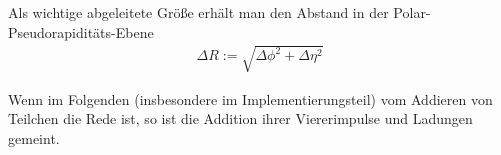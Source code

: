 Als wichtige abgeleitete Größe erhält man den Abstand in der
Polar-Pseudorapiditäts-Ebene
\begin{align}
  \Delta R := \sqrt{\Delta\phi^2 + \Delta\eta^2}
  \label{def:dr}
\end{align}

Wenn im Folgenden (insbesondere im Implementierungsteil) vom Addieren von
Teilchen die Rede ist, so ist die Addition ihrer Viererimpulse und Ladungen
gemeint.
